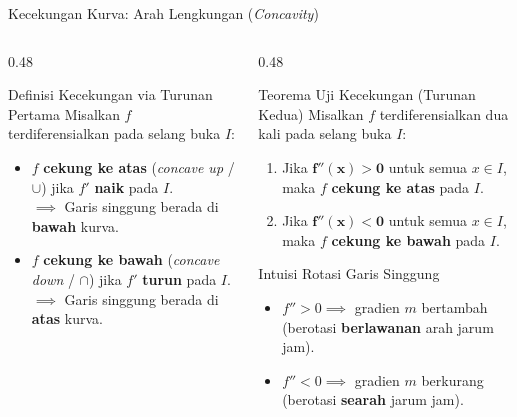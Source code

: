 \documentclass[aspectratio=169,10pt]{beamer}
\begin{document}
\begin{frame}{Kecekungan Kurva: Arah Lengkungan (\textit{Concavity})}
    \begin{columns}[T]
        \begin{column}{0.48\textwidth}
            \begin{block}{Definisi Kecekungan via Turunan Pertama}
                Misalkan $f$ terdiferensialkan pada selang buka $I$:
                \begin{itemize}
                    \item $f$ \textbf{cekung ke atas} (\textit{concave up} / $\cup$) jika $f'$ \textbf{naik} pada $I$.\\
                    {\scriptsize $\implies$ Garis singgung berada di \textbf{bawah} kurva.}
                    \item $f$ \textbf{cekung ke bawah} (\textit{concave down} / $\cap$) jika $f'$ \textbf{turun} pada $I$.\\
                    {\scriptsize $\implies$ Garis singgung berada di \textbf{atas} kurva.}
                \end{itemize}
            \end{block}
        \end{column}

        \begin{column}{0.48\textwidth}
            \begin{exampleblock}{Teorema Uji Kecekungan (Turunan Kedua)}
                Misalkan $f$ terdiferensialkan dua kali pada selang buka $I$:
                \begin{enumerate}
                    \item Jika $\mathbf{f''(x) > 0}$ untuk semua $x \in I$, maka $f$ \textbf{cekung ke atas} pada $I$.
                    \item Jika $\mathbf{f''(x) < 0}$ untuk semua $x \in I$, maka $f$ \textbf{cekung ke bawah} pada $I$.
                \end{enumerate}
            \end{exampleblock}

            \begin{alertblock}{Intuisi Rotasi Garis Singgung}
                \begin{itemize}
                    \item $f'' > 0 \implies$ gradien $m$ bertambah (berotasi \textbf{berlawanan} arah jarum jam).
                    \item $f'' < 0 \implies$ gradien $m$ berkurang (berotasi \textbf{searah} jarum jam).
                \end{itemize}
            \end{alertblock}
        \end{column}
    \end{columns}
\end{frame}
\end{document}
